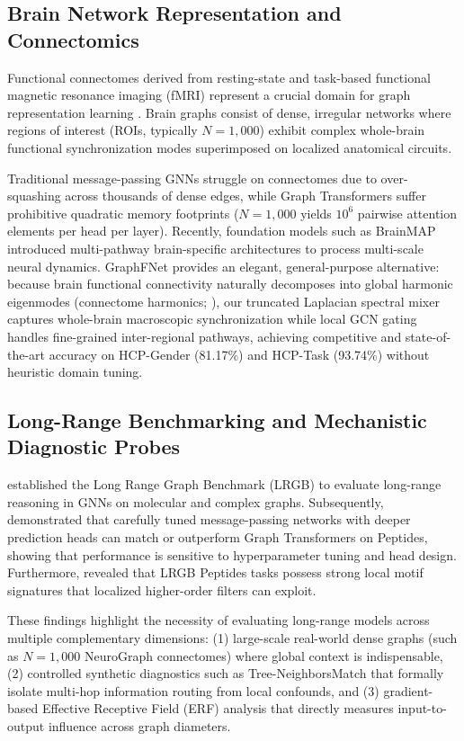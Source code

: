 \documentclass[10pt]{article}
\begin{document}
\subsection{Brain Network Representation and Connectomics}
Functional connectomes derived from resting-state and task-based functional magnetic resonance imaging (fMRI) represent a crucial domain for graph representation learning \citep{said2023neurograph}. Brain graphs consist of dense, irregular networks where regions of interest (ROIs, typically $N=1,000$) exhibit complex whole-brain functional synchronization modes superimposed on localized anatomical circuits.

Traditional message-passing GNNs struggle on connectomes due to over-squashing across thousands of dense edges, while Graph Transformers suffer prohibitive quadratic memory footprints ($N=1,000$ yields $10^6$ pairwise attention elements per head per layer). Recently, foundation models such as BrainMAP \citep{wang2025brainmap} introduced multi-pathway brain-specific architectures to process multi-scale neural dynamics. GraphFNet provides an elegant, general-purpose alternative: because brain functional connectivity naturally decomposes into global harmonic eigenmodes (connectome harmonics; \citealt{chung1997spectral}), our truncated Laplacian spectral mixer captures whole-brain macroscopic synchronization while local GCN gating handles fine-grained inter-regional pathways, achieving competitive and state-of-the-art accuracy on HCP-Gender (81.17\%) and HCP-Task (93.74\%) without heuristic domain tuning.

\subsection{Long-Range Benchmarking and Mechanistic Diagnostic Probes}
\citet{dwivedi2022long} established the Long Range Graph Benchmark (LRGB) to evaluate long-range reasoning in GNNs on molecular and complex graphs. Subsequently, \citet{tonshoff2024where} demonstrated that carefully tuned message-passing networks with deeper prediction heads can match or outperform Graph Transformers on Peptides, showing that performance is sensitive to hyperparameter tuning and head design. Furthermore, \citet{bamberger2025measuring} revealed that LRGB Peptides tasks possess strong local motif signatures that localized higher-order filters can exploit.

These findings highlight the necessity of evaluating long-range models across multiple complementary dimensions: (1) large-scale real-world dense graphs (such as $N=1,000$ NeuroGraph connectomes) where global context is indispensable, (2) controlled synthetic diagnostics such as Tree-NeighborsMatch \citep{alon2021bottleneck} that formally isolate multi-hop information routing from local confounds, and (3) gradient-based Effective Receptive Field (ERF) analysis that directly measures input-to-output influence across graph diameters.
\end{document}
